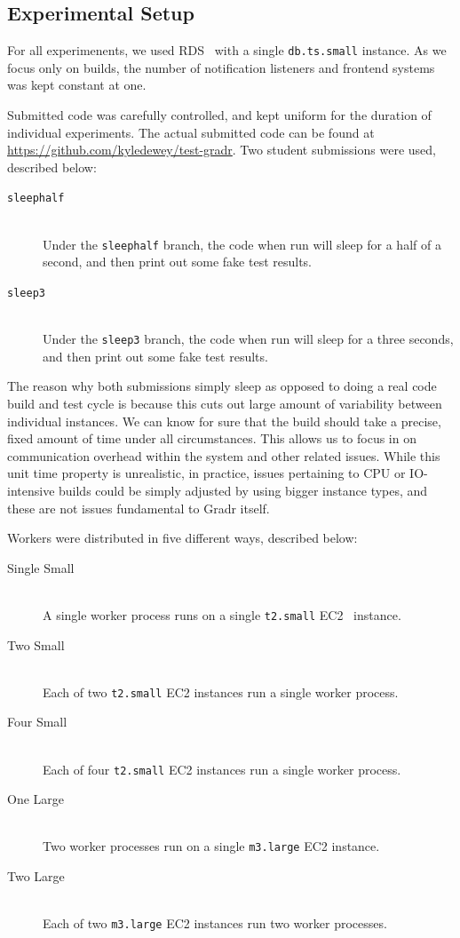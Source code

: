 \documentclass{scrartcl}
\begin{document}
\subsection{Experimental Setup}
For all experimenents, we used RDS~\cite{rds} with a single \texttt{db.ts.small} instance.
As we focus only on builds, the number of notification listeners and frontend systems was kept constant at one.

Submitted code was carefully controlled, and kept uniform for the duration of individual experiments.
The actual submitted code can be found at \url{https://github.com/kyledewey/test-gradr}.
Two student submissions were used, described below:
\begin{description}
  \item[\texttt{sleephalf}] \hfill \\
    Under the \texttt{sleephalf} branch, the code when run will sleep for a half of a second, and then print out some fake test results.

  \item[\texttt{sleep3}] \hfill \\
    Under the \texttt{sleep3} branch, the code when run will sleep for a three seconds, and then print out some fake test results.
\end{description}

The reason why both submissions simply sleep as opposed to doing a real code build and test cycle is because this cuts out large amount of variability between individual instances.
We can know for sure that the build should take a precise, fixed amount of time under all circumstances.
This allows us to focus in on communication overhead within the system and other related issues.
While this unit time property is unrealistic, in practice, issues pertaining to CPU or IO-intensive builds could be simply adjusted by using bigger instance types, and these are not issues fundamental to Gradr itself.

Workers were distributed in five different ways, described below:
\begin{description}
  \item[Single Small] \hfill \\
    A single worker process runs on a single \texttt{t2.small} EC2~\cite{ec2} instance.

  \item[Two Small] \hfill \\
    Each of two \texttt{t2.small} EC2 instances run a single worker process.

  \item[Four Small] \hfill \\
    Each of four \texttt{t2.small} EC2 instances run a single worker process.

  \item[One Large] \hfill \\
    Two worker processes run on a single \texttt{m3.large} EC2 instance.

  \item[Two Large] \hfill \\
    Each of two \texttt{m3.large} EC2 instances run two worker processes.
\end{description}
\end{document}
